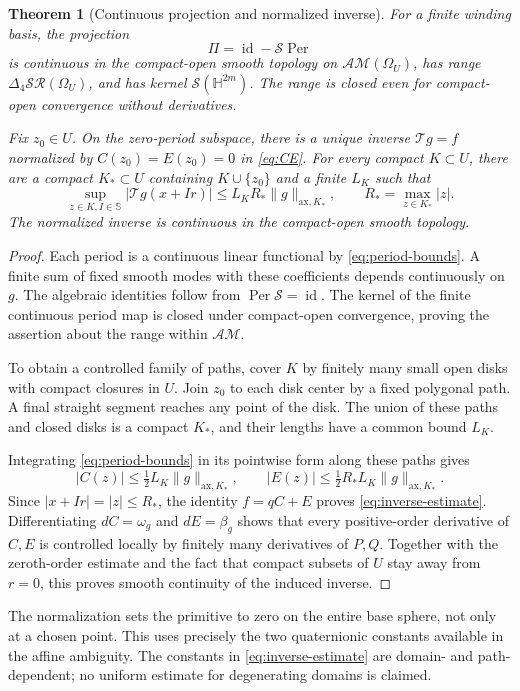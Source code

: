 \documentclass[11pt,a4paper]{article}
\numberwithin{equation}{section}
\newtheorem{theorem}{Theorem}[section]
\theoremstyle{definition}
\theoremstyle{remark}
\newcommand{\HH}{\mathbb H}
\newcommand{\SSS}{\mathbb S}
\newcommand{\SR}{\mathcal{SR}}
\newcommand{\AM}{\mathcal{AM}}
\newcommand{\Fu}{\Delta_4}
\newcommand{\Per}{\operatorname{Per}}
\newcommand{\ax}{\mathrm{ax}}
\newcommand{\norm}[1]{\lVert#1\rVert}
\begin{document}
\begin{theorem}[Continuous projection and normalized inverse]
\label{thm:continuous}
For a finite winding basis, the projection
\begin{equation}
 \Pi=\operatorname{id}-\mathcal S\Per
 \label{eq:projection}
\end{equation}
is continuous in the compact-open smooth topology on $\AM(\Omega_U)$,
has range $\Fu\SR(\Omega_U)$, and has kernel $\mathcal S(\HH^{2m})$.
The range is closed even for compact-open convergence without derivatives.

Fix $z_0\in U$. On the zero-period subspace, there is a unique inverse
$\mathcal T g=f$ normalized by $C(z_0)=E(z_0)=0$ in \eqref{eq:CE}.
For every compact $K\subset U$, there are a compact $K_*\subset U$
containing $K\cup\{z_0\}$ and a finite $L_K$ such that
\begin{equation}
 \sup_{z\in K,I\in\SSS}|\mathcal T g(x+Ir)|
 \le L_K R_*\norm{g}_{\ax,K_*},\qquad
 R_*=\max_{z\in K_*}|z|.\label{eq:inverse-estimate}
\end{equation}
The normalized inverse is continuous in the compact-open smooth topology.
\end{theorem}
\begin{proof}
Each period is a continuous linear functional by
\eqref{eq:period-bounds}. A finite sum of fixed smooth modes with these
coefficients depends continuously on $g$. The algebraic identities follow
from $\Per\mathcal S=\operatorname{id}$. The kernel of the finite
continuous period map is closed under compact-open convergence, proving
the assertion about the range within $\AM$.

To obtain a controlled family of paths, cover $K$ by finitely many small
open disks with compact closures in $U$. Join $z_0$ to each disk center
by a fixed polygonal path. A final straight segment reaches any point
of the disk. The union of these paths and closed disks is a compact
$K_*$, and their lengths have a common bound $L_K$.

Integrating \eqref{eq:period-bounds} in its pointwise form along these
paths gives
\[
 |C(z)|\le\tfrac12L_K\norm{g}_{\ax,K_*},\qquad
 |E(z)|\le\tfrac12R_*L_K\norm{g}_{\ax,K_*}.
\]
Since $|x+Ir|=|z|\le R_*$, the identity $f=qC+E$ proves
\eqref{eq:inverse-estimate}. Differentiating $dC=\omega_g$ and
$dE=\beta_g$ shows that every positive-order derivative of $C,E$ is
controlled locally by finitely many derivatives of $P,Q$. Together with
the zeroth-order estimate and the fact that compact subsets of $U$ stay
away from $r=0$, this proves smooth continuity of the induced inverse.
\end{proof}
The normalization sets the primitive to zero on the entire base sphere,
not only at a chosen point. This uses precisely the two quaternionic
constants available in the affine ambiguity. The constants in
\eqref{eq:inverse-estimate} are domain- and path-dependent; no uniform
estimate for degenerating domains is claimed.
\end{document}
